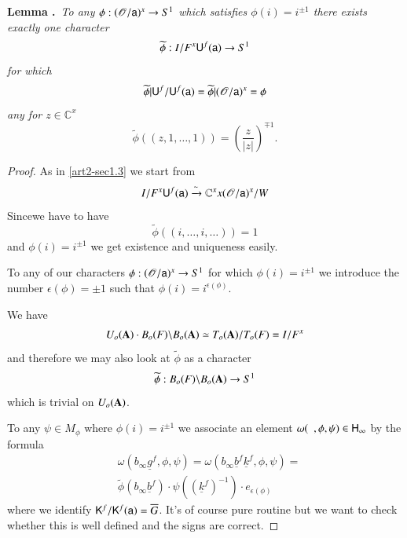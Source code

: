\medskip
\noindent
{\bf Lemma .\label{art2-lem1.6.2}}~{\em To any $\phi:(\mathscr{O}/\mathsf{a})^{x}\to S^{1}$ which satisfies $\phi(i)=i^{\pm 1}$ there exists exactly one character}
$$
\widetilde{\phi}:I/F^{x}\mathsf{U}^{f}(\mathsf{a})\to S^{1}
$$
{\em for which}
$$
\widetilde{\phi}|\mathsf{U}^{f}/\mathsf{U}^{f}(\mathsf{a})=\widetilde{\phi}|(\mathscr{O}/\mathsf{a})^{x}=\phi
$$
{\em any for $z\in \mathbb{C}^{x}$}
$$
\widetilde{\phi}((z,1,\ldots,1))=\left(\frac{z}{|z|}\right)^{\mp 1}.
$$

\begin{proof}
As in \ref{art2-sec1.3} we start from
$$
I/F^{x}\mathsf{U}^{f}(\mathsf{a})\xrightarrow{\sim}\mathbb{C}^{x}x(\mathscr{O}/\mathsf{a})^{x}/W
$$
Since\pageoriginale we have to have
$$
\widetilde{\phi}((i,\ldots,i,\ldots))=1
$$
and $\phi(i)=i^{\pm 1}$ we get existence and uniqueness easily.

To any of our characters $\phi:(\mathscr{O}/\mathsf{a})^{x}\to S^{1}$ for which $\phi(i)=i^{\pm 1}$ we introduce the number $\epsilon (\phi)=\pm 1$ such that $\phi(i)=i^{\epsilon(\phi)}$.

We have
$$
U_{o}(\mathbf{A})\cdot B_{o}(F)\backslash B_{o}(\mathbf{A})\simeq T_{o}(\mathbf{A})/T_{o}(F)=I/F^{x}
$$
and therefore we may also look at $\widetilde{\phi}$ as a character
$$
\widetilde{\phi}:B_{o}(F)\backslash B_{o}(\mathbf{A})\to S^{1}
$$
which is trivial on $U_{o}(\mathbf{A})$.

To any $\psi\in M_{\phi}$ where $\phi(i)=i^{\pm 1}$ we associate an element $\omega( \ \ , \phi,\psi)\in \mathsf{H}_{\infty}$ by the formula
\begin{align*}
& \omega(b_{\infty}\underline{g}^{f},\phi,\psi)=\omega(b_{\infty}\underline{b}^{f}\underline{k}^{f},\phi,\psi)=\\
& \widetilde{\phi}(b_{\infty}\underline{b}^{f})\cdot\psi ((\underline{k}^{f})^{-1})\cdot e_{\epsilon(\phi)}
\end{align*}
where we identify $\mathsf{K}^{f}/\mathsf{K}^{f}(\mathsf{a})=\overline{G}$. It's of course pure routine but we want to check whether this is well defined and the signs are correct.


\end{proof}
